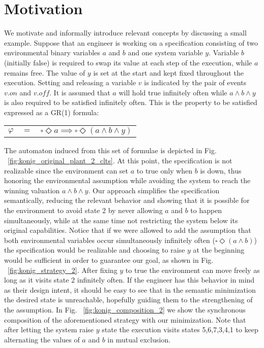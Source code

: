 \section{Motivation}\label{sec:motivation}
We motivate and informally introduce relevant concepts by discussing a small example. 
Suppose that an engineer is working on a specification consisting of two environmental 
binary variables $a$ and $b$ and one system variable $y$. Variable $b$ 
(initially false) is required to swap its value at each step of the execution, while $a$ 
remains free. The value of $y$ is set at the start and kept fixed throughout the 
execution. Setting and releasing a variable $v$ is indicated by the pair of events $v.on$ and $v.off$.
It is assumed that $a$ will hold true infinitely often while $a \wedge b \wedge y$ is also required to be satisfied infinitely often. This is the property to be satisfied expressed as a GR(1) formula: 
\begin{center}
	\begin{tabular}{ r c l }
		$\varphi$& $=$ &$\square \Diamond a\implies\square \Diamond (a \wedge b \wedge y)$\\
	\end{tabular}
\end{center}
The automaton induced from this set of formulae is depicted in Fig. ~\ref{fig:konig_original_plant_2_clts}. At this point, the specification is not realizable since the environment can set $a$ to true only when $b$ is down, thus honoring the environmental assumption while avoiding the system to reach the winning valuation $a \wedge b \wedge y$.  
Our approach simplifies the specification semantically, reducing the relevant behavior and showing that it is possible for the environment to avoid state 2 by never allowing $a$ and $b$ to happen simultaneously, while at the same time not restricting the system below its original capabilities.
 Notice that if we were allowed to add the assumption that both environmental variables occur simultaneously infinitely often ($\square \Diamond (a \wedge b)$) the specification would be realizable and choosing to raise $y$ at the beginning would be sufficient in order to guarantee our goal, as shown in Fig. ~\ref{fig:konig_strategy_2}. After fixing $y$ to true the environment can move freely as long as it visits state 2 infinitely often. If the engineer has this behavior in mind as their design intent, it should be easy to see that in the semantic minimization the desired state is unreachable, hopefully guiding them to the strengthening of the assumption.  In Fig. ~\ref{fig:konig_composition_2} we show the synchronous composition of the aforementioned strategy with our minimization. Note that after letting the system raise $y$ state the execution visits states 5,6,7,3,4,1 to keep alternating the values of $a$ and $b$ in mutual exclusion.

